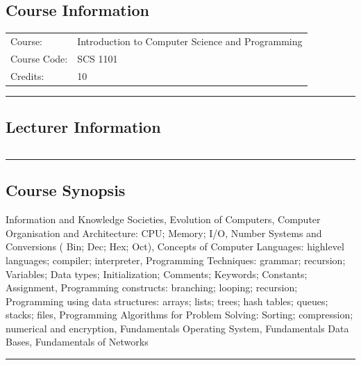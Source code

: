 
\subsection*{Course Information}
\vspace{0ex}%
\noindent\parbox{0.5\textwidth}{%
    \noindent\begin{tabular}{@{}ll}
                 \textsf{Course:}          & 	Introduction to Computer Science and Programming \\
                 \textsf{Course Code:}         & 	SCS 1101    \\
                 \textsf{Credits:}    & 	10
    \end{tabular}}
\vspace{2ex}\hrule\vspace{2ex}

\subsection*{Lecturer Information}
\noindent\parbox{0.5\textwidth}{%
    \noindent\begin{tabular}{@{}ll}
                 
    \end{tabular}}
\vspace{2ex}\hrule\vspace{2ex}


\subsection*{Course Synopsis}
Information and Knowledge Societies, Evolution of Computers, Computer Organisation and Architecture: CPU; Memory; I/O, Number Systems and Conversions ( Bin; Dec; Hex; Oct), Concepts of Computer Languages: high\low level languages; compiler; interpreter, Programming Techniques: grammar; recursion; Variables; Data types; Initialization; Comments; Keywords; Constants; Assignment, Programming constructs: branching; looping; recursion; Programming using data structures: arrays; lists; trees; hash tables; queues; stacks; files, Programming Algorithms for Problem Solving: Sorting; compression; numerical and encryption, Fundamentals Operating System, Fundamentals Data Bases, Fundamentals of Networks
\vspace{2ex} \hrule\vspace{2ex}

